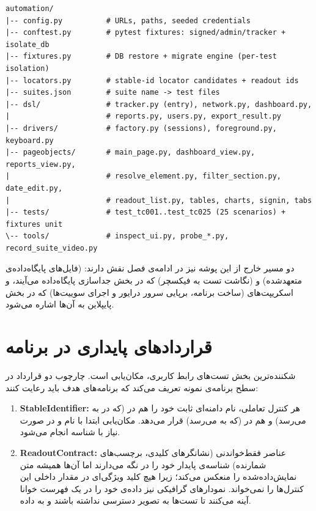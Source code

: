\begin{latin}
\begin{lstlisting}[numbers=none, basicstyle=\ttfamily\scriptsize]
automation/
|-- config.py          # URLs, paths, seeded credentials
|-- conftest.py        # pytest fixtures: signed/admin/tracker + isolate_db
|-- fixtures.py        # DB restore + migrate engine (per-test isolation)
|-- locators.py        # stable-id locator candidates + readout ids
|-- suites.json        # suite name -> test files
|-- dsl/               # tracker.py (entry), network.py, dashboard.py,
|                      # reports.py, users.py, export_result.py
|-- drivers/           # factory.py (sessions), foreground.py, keyboard.py
|-- pageobjects/       # main_page.py, dashboard_view.py, reports_view.py,
|                      # resolve_element.py, filter_section.py, date_edit.py,
|                      # readout_list.py, tables, charts, signin, tabs
|-- tests/             # test_tc001..test_tc025 (25 scenarios) + fixtures unit
\-- tools/             # inspect_ui.py, probe_*.py, record_suite_video.py
\end{lstlisting}
\end{latin}

دو مسیر خارج از این پوشه نیز در ادامه‌ی فصل نقش دارند:
(فایل‌های پایگاه‌داده‌ی متعهدشده) و
(نگاشت تست به فیکسچر) که در بخش جداسازی پایگاه‌داده می‌آیند، و اسکریپت‌های
(ساخت برنامه، برپایی سرور درایور و اجرای سوییت‌ها) که در بخش پایپلاین به آن‌ها اشاره می‌شود.

\section{قراردادهای پایداری در برنامه}
شکننده‌ترین بخش تست‌های رابط کاربری، مکان‌یابی است. چارچوب دو قرارداد در سطح برنامه‌ی نمونه تعریف می‌کند که برنامه‌های هدف باید رعایت کنند:
\begin{enumerate}
	\item \textbf{\gls{StableIdentifier}:}
	هر کنترل تعاملی، نام دامنه‌ای ثابت خود را هم در
	(که در
	\cite{uia}
	به
	می‌رسد) و هم در
	(که به
	می‌رسد) قرار می‌دهد. مکان‌یابی ابتدا با نام و در صورت نیاز با شناسه انجام می‌شود.
	\item \textbf{\gls{ReadoutContract}:}
	عناصر فقط‌خواندنی (نشانگرهای کلیدی، برچسب‌های شمارنده) شناسه‌ی پایدار خود را در
	نگه می‌دارند اما
	آن‌ها همیشه متن نمایش‌داده‌شده را منعکس می‌کند؛ زیرا هیچ کلید ویژگی‌ای در
	مقدار داخلی این کنترل‌ها را نمی‌خواند. نمودارهای گرافیکی نیز داده‌ی خود را در یک فهرست خوانا آینه می‌کنند تا تست‌ها به تصویر دسترسی نداشته باشند و به داده.
\end{enumerate}

